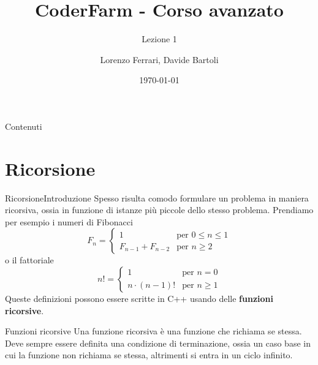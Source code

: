 \documentclass{beamer}
\title{CoderFarm - Corso avanzato}
\subtitle{Lezione 1}
\author{Lorenzo Ferrari, Davide Bartoli}
\date{\today}
\begin{document}
\begin{frame}
    \titlepage
\end{frame}

\begin{frame}{Contenuti}
    \tableofcontents
\end{frame}

\section{Ricorsione}
\begin{frame}{Ricorsione}{Introduzione}
    Spesso risulta comodo formulare un problema in maniera ricorsiva, ossia in funzione di istanze pi\`u piccole dello stesso problema.
    \pause
    Prendiamo per esempio i numeri di Fibonacci
    \[
        F_n =
        \begin{cases}
            1 \quad & \text{per } 0 \leq n \leq 1 \\
            F_{n-1} + F_{n-2} & \text{per } n \geq 2
        \end{cases}
    \]
    \pause
    o il fattoriale
    \[
        n! =
        \begin{cases}
            1 & \text{per } n = 0 \\
            n \cdot (n-1)! & \text{per } n \geq 1
        \end{cases}
    \]
    \pause
    Queste definizioni possono essere scritte in C++ usando delle \textbf{funzioni ricorsive}.
\end{frame}

\begin{frame}{Funzioni ricorsive}{}
    Una funzione ricorsiva \`e una funzione che richiama se stessa.\\
    \pause 
    Deve sempre essere definita una condizione di terminazione, ossia un caso base in cui la funzione non richiama se stessa,
    altrimenti si entra in un ciclo infinito.
\end{frame}
\end{document}
